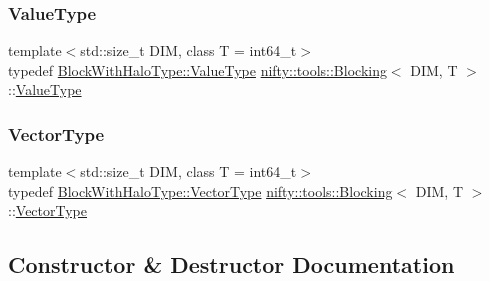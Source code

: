 \mbox{\label{classnifty_1_1tools_1_1Blocking_ae04f69cd6e67bbde26eee3f38e0257f7}} 
\subsubsection{\texorpdfstring{Value\+Type}{ValueType}}
{\footnotesize\ttfamily template$<$std\+::size\+\_\+t D\+IM, class T  = int64\+\_\+t$>$ \\
typedef \hyperlink{classnifty_1_1tools_1_1BlockWithHalo_a65d120db84dfca7586ae5ab30f26f01b}{Block\+With\+Halo\+Type\+::\+Value\+Type} \hyperlink{classnifty_1_1tools_1_1Blocking}{nifty\+::tools\+::\+Blocking}$<$ D\+IM, T $>$\+::\hyperlink{classnifty_1_1tools_1_1Blocking_ae04f69cd6e67bbde26eee3f38e0257f7}{Value\+Type}}

\mbox{\label{classnifty_1_1tools_1_1Blocking_a5f8df3d4cdf09803217d729a04018fb3}} 
\subsubsection{\texorpdfstring{Vector\+Type}{VectorType}}
{\footnotesize\ttfamily template$<$std\+::size\+\_\+t D\+IM, class T  = int64\+\_\+t$>$ \\
typedef \hyperlink{classnifty_1_1tools_1_1BlockWithHalo_a040d8a654eb42791c6e5fbd4dfd51b9f}{Block\+With\+Halo\+Type\+::\+Vector\+Type} \hyperlink{classnifty_1_1tools_1_1Blocking}{nifty\+::tools\+::\+Blocking}$<$ D\+IM, T $>$\+::\hyperlink{classnifty_1_1tools_1_1Blocking_a5f8df3d4cdf09803217d729a04018fb3}{Vector\+Type}}



\subsection{Constructor \& Destructor Documentation}
\mbox{\label{classnifty_1_1tools_1_1Blocking_a72c8db4f834fd774f6a50e03ef4b30c2}} 
